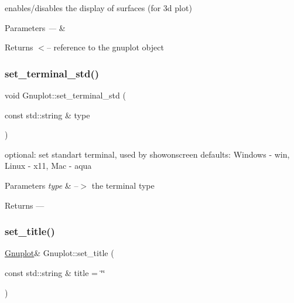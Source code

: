 enables/disables the display of surfaces (for 3d plot)


\begin{DoxyParams}{Parameters}
{\em ---} & \\
\hline
\end{DoxyParams}
\begin{DoxyReturn}{Returns}
$<$-- reference to the gnuplot object 
\end{DoxyReturn}
\mbox{\label{classGnuplot_a21feba7a3916708b742c3dc25850ab2f}} 
\subsubsection{\texorpdfstring{set\+\_\+terminal\+\_\+std()}{set\_terminal\_std()}}
{\footnotesize\ttfamily void Gnuplot\+::set\+\_\+terminal\+\_\+std (\begin{DoxyParamCaption}\item[{const std\+::string \&}]{type }\end{DoxyParamCaption})\hspace{0.3cm}{\ttfamily [static]}}

optional\+: set standart terminal, used by showonscreen defaults\+: Windows -\/ win, Linux -\/ x11, Mac -\/ aqua


\begin{DoxyParams}{Parameters}
{\em type} & --$>$ the terminal type\\
\hline
\end{DoxyParams}
\begin{DoxyReturn}{Returns}
--- 
\end{DoxyReturn}
\mbox{\label{classGnuplot_a4f93bac0e69dd83806652ca7226c6b3b}} 
\subsubsection{\texorpdfstring{set\+\_\+title()}{set\_title()}}
{\footnotesize\ttfamily \hyperlink{classGnuplot}{Gnuplot}\& Gnuplot\+::set\+\_\+title (\begin{DoxyParamCaption}\item[{const std\+::string \&}]{title = {\ttfamily \char`\"{}\char`\"{}} }\end{DoxyParamCaption})\hspace{0.3cm}{\ttfamily [inline]}}



